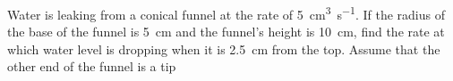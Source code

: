 
%
%
%
%
% 

\question[3]  Water is leaking from a conical funnel at the rate of \SI{5}{\cubic\centi\metre\per\second}.
If the radius of the base of the funnel is \SI{5}{\centi\meter} and the funnel's height is 
\SI{10}{\centi\meter}, find the rate at which water level is dropping when it is 
\SI{2.5}{\centi\meter} from the top. Assume that the other end of the funnel is a tip

\ifprintanswers
\fi 

